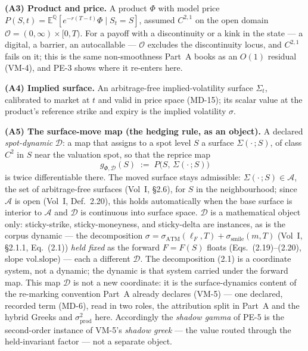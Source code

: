 \documentclass[11pt,a4paper]{article}
\newcommand{\sprod}{\sigma_{\mathrm{prod}}}
\newcommand{\satm}{\sigma_{\mathrm{ATM}}}
\newcommand{\ssm}{\sigma_{\mathrm{smile}}}
\newcommand{\lF}{\ell_F}
\newcommand{\volslope}{\mathrm{vol.slope}}
\begin{document}
\textbf{(A3) Product and price.} A product $\Phi$ with model price
$P(S,t) = \mathbb{E}^{\mathbb Q}\!\left[e^{-r(T-t)}\Phi \mid S_t = S\right]$,
assumed $C^{2,1}$ on the open domain
$\mathcal{O} = (0,\infty)\times[0,T)$. For a payoff with a discontinuity or a
kink in the state --- a digital, a barrier, an autocallable --- $\mathcal{O}$
excludes the discontinuity locus, and $C^{2,1}$ fails on it; this is the same
non-smoothness Part~A books as an $O(1)$ residual (VM-4), and PE-3 shows where
it re-enters here.

\textbf{(A4) Implied surface.} An arbitrage-free implied-volatility surface
$\Sigma_t$, calibrated to market at $t$ and valid in price space (MD-15); its
scalar value at the product's reference strike and expiry is the implied
volatility $\sigma$.

\textbf{(A5) The surface-move map (the hedging rule, as an object).} A declared
\emph{spot-dynamic} $\mathcal{D}$: a map that assigns to a spot level $S$ a
surface $\Sigma(\cdot\,;S)$, of class $C^2$ in $S$ near the valuation spot, so
that the reprice map
\begin{equation}\label{pe:reprice}
  g_{\Phi,\mathcal D}(S) \;:=\; P\bigl(S,\,\Sigma(\cdot\,;S)\bigr)
\end{equation}
is twice differentiable there. The moved surface stays admissible:
$\Sigma(\cdot\,;S)\in\mathcal{A}$, the set of arbitrage-free surfaces
(Vol~I, \S2.6), for $S$ in the neighbourhood; since $\mathcal{A}$ is open
(Vol~I, Def.~2.20), this holds automatically when the base surface is interior
to $\mathcal{A}$ and $\mathcal{D}$ is continuous into surface space.
$\mathcal{D}$ is a mathematical object only: sticky-strike, sticky-moneyness,
and sticky-delta are instances, as is the corpus dynamic --- the decomposition
$\sigma=\satm(\lF,T)+\ssm(m,T)$ (Vol~I, \S2.1.1, Eq.~(2.1)) \emph{held fixed}
as the forward $F=F(S)$ floats (Eqs.~(2.19)--(2.20), slope $\volslope$) --- each
a different $\mathcal{D}$. The decomposition (2.1) is a coordinate system, not a
dynamic; the dynamic is that system carried under the forward map. This map
$\mathcal{D}$ is not a new coordinate: it is the surface-dynamics content of the
re-marking convention Part~A already declares (VM-5) --- one declared, recorded
term (MD-6), read in two roles, the attribution split in Part~A and the hybrid
Greeks and $\sprod^2$ here. Accordingly the \emph{shadow gamma} of PE-5 is the
second-order instance of VM-5's \emph{shadow greek} --- the value routed through
the held-invariant factor --- not a separate object.
\end{document}
